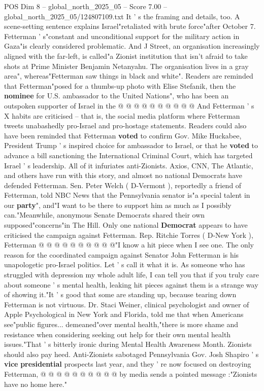\begin{textsample}{POS Dim 8 – global\_north\_2025\_05 – Score 7.00 – global\_north\_2025\_05/124807109.txt}
It ' s the framing and details, too.
A scene-setting sentence explains Israel"retaliated with brute force"after October 7.
Fetterman ' s"constant and unconditional support for the military action in Gaza"is clearly considered problematic.
And J Street, an organisation increasingly aligned with the far-left, is called"a Zionist institution that isn't afraid to take shots at Prime Minister Benjamin Netanyahu.
The organisation lives in a gray area", whereas"Fetterman saw things in black and white".
Readers are reminded that Fetterman"posed for a thumbs-up photo with Elise Stefanik, then the \textbf{nominee} for U.S. ambassador to the United Nations", who has been an outspoken supporter of Israel in the @ @ @ @ @ @ @ @ @ @ And Fetterman ' s X habits are criticised -- that is, the social media platform where Fetterman tweets unabashedly pro-Israel and pro-hostage statements.
Readers could also have been reminded that Fetterman \textbf{voted} to confirm Gov.
Mike Huckabee, President Trump ' s inspired choice for ambassador to Israel, or that he \textbf{voted} to advance a bill sanctioning the International Criminal Court, which has targeted Israel ' s leadership.
All of it infuriates anti-Zionists.
Axios, CNN, The Atlantic, and others have run with this story, and almost no national Democrats have defended Fetterman.
Sen.
Peter Welch ( D-Vermont ), reportedly a friend of Fetterman, told NBC News that the Pennsylvania senator is"a special talent in our \textbf{party}", and"I want to be there to support him as much as I possibly can."Meanwhile, anonymous Senate Democrats shared their own supposed"concerns"in The Hill.
Only one national \textbf{Democrat} appears to have criticised the campaign against Fetterman.
Rep.
Ritchie Torres ( D-New York ), Fetterman @ @ @ @ @ @ @ @ @ @"I know a hit piece when I see one.
The only reason for the coordinated campaign against Senator John Fetterman is his unapologetic pro-Israel politics.
Let ' s call it what it is.
As someone who has struggled with depression my whole adult life, I can tell you that if you truly care about someone ' s mental health, leaking hit pieces against them is a strange way of showing it."It ' s good that some are standing up, because tearing down Fetterman is not virtuous.
Dr.
Staci Weiner, clinical psychologist and owner of Apple Psychological in New York and Florida, told me that when Americans see"public figures... demeaned"over mental health,"there is more shame and resistance when considering seeking out help for their own mental health issues."That ' s bitterly ironic during Mental Health Awareness Month.
Zionists should also pay heed.
Anti-Zionists sabotaged Pennsylvania Gov.
Josh Shapiro ' s \textbf{vice} \textbf{presidential} prospects last year, and they ' re now focused on destroying Fetterman, @ @ @ @ @ @ @ @ @ @ by media sends a pointed message :"Zionists have no home here."

\end{textsample}
